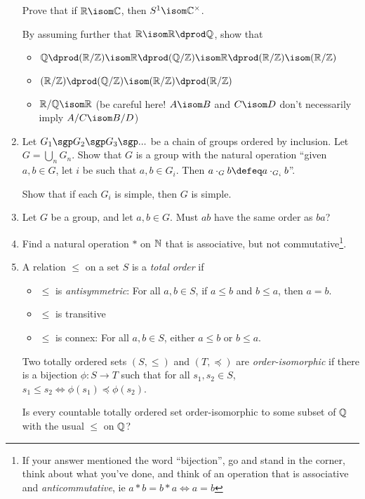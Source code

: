 \documentclass[a4paper,12pt]{article}
\begin{document}
\begin{enumerate}[leftmargin=*]
  Prove that if \(\R \isom \C\), then \(S^1 \isom \C^\times\).

  By assuming further that \(\R \isom \R \dprod \Q\), show that
  \begin{itemize}
   \item
    \(\Q \dprod (\R/\Z) \isom \R \dprod (\Q/\Z) \isom
      \R \dprod (\R/\Z) \isom (\R/\Z)\)
   \item
    \((\R/\Z) \dprod (\Q/\Z) \isom (\R/\Z) \dprod (\R/\Z)\)
   \item
    \(\R/\Q \isom \R\)
    (be careful here! \(A \isom B\) and \(C \isom D\) don't necessarily imply
    \(A/C \isom B/D\))
  \end{itemize}
 \item
  Let \(G_1 \sgp G_2 \sgp G_3 \sgp ...\) be a chain of groups ordered by
  inclusion. Let \(G = \bigcup_n G_n\). Show that \(G\) is a group with the
  natural operation ``given \(a, b \in G\), let \(i\) be such that
  \(a, b \in G_i\). Then \(a \cdot_G b \defeq a \cdot_{G_i} b\)''.

  Show that if each \(G_i\) is simple, then \(G\) is simple.
 \item
  Let \(G\) be a group, and let \(a, b \in G\). Must \(ab\) have the same order
  as \(ba\)?
 \item
  Find a natural operation \(\ast\) on \(\mathbb N\) that is associative, but not
  commutative\footnote{If your answer mentioned the word ``bijection'', go and
  stand in the corner, think about what you've done, and think of an operation
  that is associative and \emph{anticommutative}, ie
  \(a \ast b = b \ast a \iff a = b\)}.
 \item
  A relation \(\le\) on a set \(S\) is a \emph{total order} if
  \begin{itemize}
   \item
    \(\le\) is \emph{antisymmetric}: For all \(a, b \in S\), if \(a \le b\) and
    \(b \le a\), then \(a = b\).
   \item
    \(\le\) is transitive
   \item
    \(\le\) is connex: For all \(a, b \in S\), either
    \(a \le b\) or \(b \le a\).
  \end{itemize}
  Two totally ordered sets \((S, \le)\) and \((T, \preceq)\) are
  \emph{order-isomorphic} if there is a bijection \(\phi: S \to T\) such that
  for all \(s_1, s_2 \in S\),
  \(s_1 \le s_2 \iff \phi(s_1) \preceq \phi(s_2)\).

  Is every countable totally ordered set order-isomorphic to some subset of
  \(\mathbb Q\) with the usual \(\le\) on \(\mathbb Q\)?


\end{enumerate}
\end{document}
